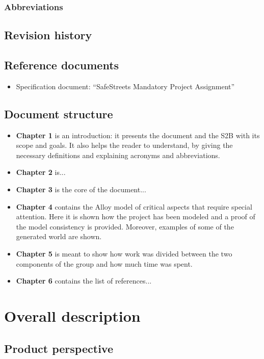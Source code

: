 \documentclass[12pt,a4paper]{report}
\begin{document}
		\subsection{Abbreviations}

	\section{Revision history}

	\section{Reference documents}
	\begin{itemize}
	\item {Specification document}: ``SafeStreets Mandatory Project Assignment''
	\end{itemize}

	\section{Document structure}
	\begin{itemize}
	\item \textbf{Chapter 1} is an introduction: it presents the document and the S2B with its scope and goals. It also helps the reader to understand, by giving the necessary definitions and explaining acronyms and abbreviations. 
	\item \textbf{Chapter 2} is...
	\item \textbf{Chapter 3} is the core of the document...
	\item \textbf{Chapter 4} contains the Alloy model of critical aspects that require special attention. Here it is shown how the project has been modeled and a proof of the model consistency is provided. Moreover, examples of some of the generated world are shown.
	\item \textbf{Chapter 5} is meant to show how work was divided between the two components of the group and how much time was spent.
	\item \textbf{Chapter 6} contains the list of references...
	\end{itemize}


\chapter{Overall description}
	\section{Product perspective}
\end{document}

